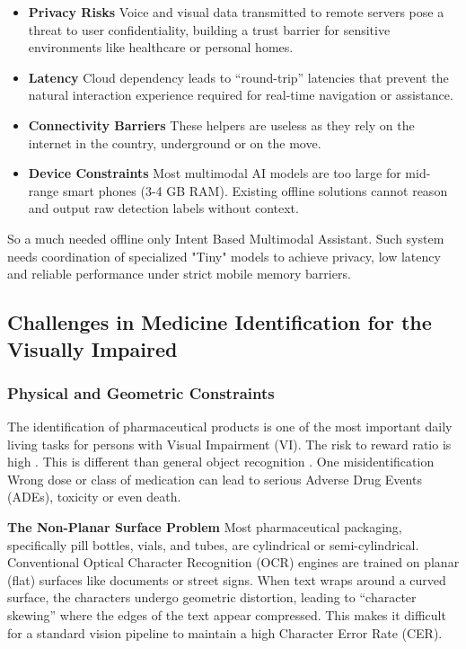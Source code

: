 \documentclass[12pt,a4paper]{report}
\begin{document}
\begin{itemize}
    \item[1.] \textbf{Privacy Risks} Voice and visual data transmitted to remote servers pose a threat to user confidentiality, building a trust barrier for sensitive environments like healthcare or personal homes.
    \item[2.] \textbf{Latency} Cloud dependency leads to “round-trip” latencies that prevent the natural interaction experience required for real-time navigation or assistance.
    \item[3.] \textbf{Connectivity Barriers} These helpers are useless as they rely on the internet in the country, underground or on the move.
    \item[4.] \textbf{Device Constraints} Most multimodal AI models are too large for mid-range smart phones (3-4 GB RAM). Existing offline solutions cannot reason and output raw detection labels without context.
\end{itemize}
 
So a much needed offline only Intent Based Multimodal Assistant. Such system needs coordination of specialized "Tiny" models to achieve privacy, low latency and reliable performance under strict mobile memory barriers.
\subsection{Challenges in Medicine Identification for the Visually Impaired}
 
\subsubsection{Physical and Geometric Constraints} 
The identification of pharmaceutical products is one of the most important daily living tasks for persons with Visual Impairment (VI). The risk to reward ratio is high . This is different than general object recognition . One misidentification Wrong dose or class of medication can lead to serious Adverse Drug Events (ADEs), toxicity or even death.

\noindent \textbf{The Non-Planar Surface Problem} Most pharmaceutical packaging, specifically pill bottles, vials, and tubes, are cylindrical or semi-cylindrical. Conventional Optical Character Recognition (OCR) engines are trained on planar (flat) surfaces like documents or street signs. When text wraps around a curved surface, the characters undergo geometric distortion, leading to “character skewing” where the edges of the text appear compressed. This makes it difficult for a standard vision pipeline to maintain a high Character Error Rate (CER).
 
\end{document}
